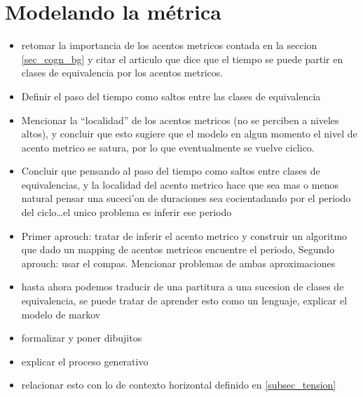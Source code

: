 \section{Modelando la m\'etrica}
\begin{itemize}
 \item retomar la importancia de los acentos metricos contada en la seccion \ref{sec_cogn_bg} y citar el articulo que dice que el tiempo se 
 puede partir en clases de equivalencia por los acentos metricos. 

 \item Definir el paso del tiempo como saltos entre las clases de equivalencia

 \item Mencionar la ``localidad'' de los acentos metricos (no se perciben a niveles altos), y concluir que esto sugiere que el modelo en algun momento
 el nivel de acento metrico se satura, por lo que eventualmente se vuelve ciclico.

 \item Concluir que pensando al paso del tiempo como saltos entre clases de equivalencias, y la localidad del acento metrico hace que sea
 mas o menos natural pensar una suceci'on de duraciones sea cocientadando por el periodo del ciclo\ldots el unico problema es inferir ese periodo

 \item Primer aprouch: tratar de inferir el acento metrico y construir un algoritmo que dado un mapping de acentos metricos encuentre el periodo,
       Segundo aprouch: usar el compas.
       Mencionar problemas de ambas aproximaciones

 \item hasta ahora podemos traducir de una partitura a una sucesion de clases de equivalencia, se puede tratar de aprender esto como un lenguaje,
 explicar el modelo de markov

 \item formalizar y poner dibujitos

 \item explicar el proceso generativo

 \item relacionar esto con lo de contexto horizontal definido en \ref{subsec_tension}

\end{itemize}

